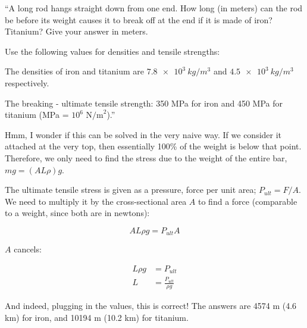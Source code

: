 \documentclass[8.01x]{subfiles}
\begin{document}
``A long rod hangs straight down from one end. How long (in meters) can the rod be before its weight causes it to break off at the end if it is made of iron? Titanium? Give your answer in meters.

Use the following values for densities and tensile strengths:

The densities of iron and titanium are $\SI{7.8e3}{kg/m^3}$ and $\SI{4.5e3}{kg/m^3}$ respectively.

The breaking - ultimate tensile strength: 350 MPa for iron and 450 MPa for titanium (MPa = $10^6 \text{ N/m}^2$).''

Hmm, I wonder if this can be solved in the very naive way. If we consider it attached at the very top, then essentially 100\% of the weight is below that point. Therefore, we only need to find the stress due to the weight of the entire bar, $m g = (A L \rho) g$.

The ultimate tensile stress is given as a pressure, force per unit area; $P_{ult} = F/A$. We need to multiply it by the cross-sectional area $A$ to find a force (comparable to a weight, since both are in newtons):

\begin{equation}
A L \rho g = P_{ult} A
\end{equation}

$A$ cancels:

\begin{align}
L \rho g &= P_{ult}\\
L &= \frac{P_{ult}}{\rho g}
\end{align}

And indeed, plugging in the values, this is correct! The answers are 4574 m (4.6 km) for iron, and 10194 m (10.2 km) for titanium.
\end{document}
